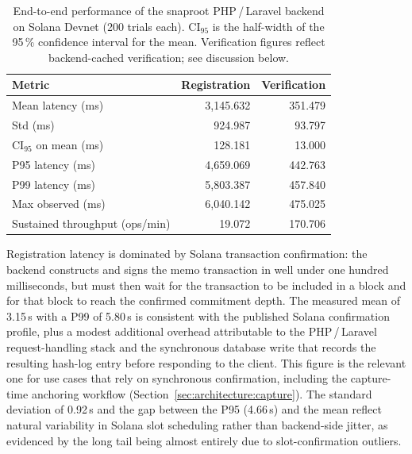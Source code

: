 \documentclass[11pt,a4paper]{article}
\begin{document}
\begin{table}[ht]
\centering
\small
\caption{End-to-end performance of the snaproot PHP\,/\,Laravel backend
on Solana Devnet (200 trials each). $\mathrm{CI}_{95}$ is the
half-width of the 95\,\% confidence interval for the mean. Verification
figures reflect backend-cached verification; see discussion below.}
\label{tab:latency}
\begin{tabular}{lrr}
\toprule
\textbf{Metric}                  & \textbf{Registration} & \textbf{Verification} \\
\midrule
Mean latency (ms)                & 3{,}145.632           & 351.479   \\
Std (ms)                         &   924.987             &  93.797   \\
$\mathrm{CI}_{95}$ on mean (ms)  &   128.181             &  13.000   \\
P95 latency (ms)                 & 4{,}659.069           & 442.763   \\
P99 latency (ms)                 & 5{,}803.387           & 457.840   \\
Max observed (ms)                & 6{,}040.142           & 475.025   \\
Sustained throughput (ops/min)   &    19.072             & 170.706   \\
\bottomrule
\end{tabular}
\end{table}

Registration latency is dominated by Solana transaction confirmation:
the backend constructs and signs the memo transaction in well under one
hundred milliseconds, but must then wait for the transaction to be
included in a block and for that block to reach the confirmed commitment
depth. The measured mean of 3.15\,s with a P99 of 5.80\,s is consistent
with the published Solana confirmation profile, plus a modest additional
overhead attributable to the PHP\,/\,Laravel request-handling stack and
the synchronous database write that records the resulting hash-log entry
before responding to the client. This figure is the relevant one for
use cases that rely on synchronous confirmation, including the
capture-time anchoring workflow
(Section~\ref{sec:architecture:capture}). The standard deviation of
0.92\,s and the gap between the P95 (4.66\,s) and the mean reflect
natural variability in Solana slot scheduling rather than backend-side
jitter, as evidenced by the long tail being almost entirely due to
slot-confirmation outliers.
\end{document}
